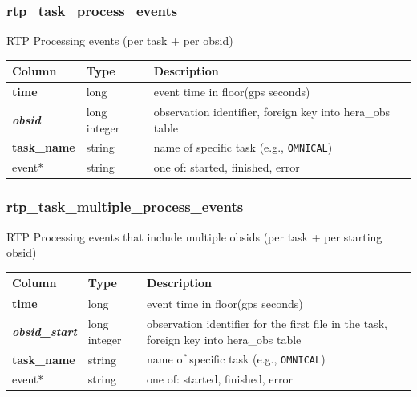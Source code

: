 \documentclass{article}
\begin{document}
{\subsubsection{rtp\_task\_process\_events}
RTP Processing events (per task + per obsid)
\begin{center}
  \begin{tabular}{| p{4cm} | p{2cm} | p{10cm} |}
    \hline
    \textbf{Column} & \textbf{Type} & \textbf{Description} \\[0.5ex] \hline\hline
    \textbf{time} & long & event time in floor(gps seconds) \\ \hline
    \textit{\textbf{obsid}} & long integer & observation identifier, foreign key into hera\_obs table \\ \hline
    \textbf{task\_name} & string & name of specific task (e.g., \verb+OMNICAL+) \\ \hline
    event* & string & one of: started, finished, error \\\hline
  \end{tabular}
\end{center}

\subsubsection{rtp\_task\_multiple\_process\_events}
RTP Processing events that include multiple obsids (per task + per starting obsid)
\begin{center}
  \begin{tabular}{| p{4cm} | p{2cm} | p{10cm} |}
    \hline
    \textbf{Column} & \textbf{Type} & \textbf{Description} \\[0.5ex] \hline\hline
    \textbf{time} & long & event time in floor(gps seconds) \\ \hline
    \textit{\textbf{obsid\_start}} & long integer & observation identifier for the first file in the task, foreign key into hera\_obs table \\ \hline
    \textbf{task\_name} & string & name of specific task (e.g., \verb+OMNICAL+) \\ \hline
    event* & string & one of: started, finished, error \\\hline
  \end{tabular}
\end{center}

}
\end{document}
